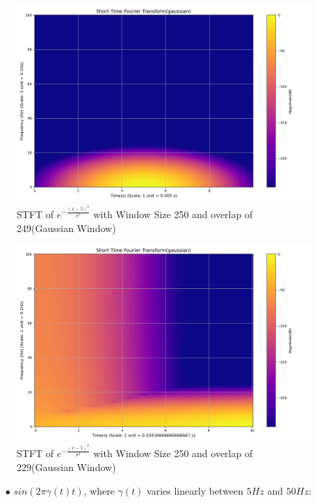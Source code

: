 \documentclass[12pt,a4paper,onecolumn]{exam}
\begin{document}
\begin{solution}
\begin{itemize}
\begin{itemize}
        \begin{figure}[H]
        \centering
        \includegraphics[scale = 0.35 ]{Gau_Win_gaussian_1_250.0.png}
        \caption{STFT of $e^{-\frac{(x-5)^2}{\sigma^2}}$ with Window Size 250 and overlap of 249(Gaussian Window)}
        \label{fig:17}
        \end{figure}

        \begin{figure}[H]
        \centering
        \includegraphics[scale = 0.35]{Gau_Win_gaussian_21_250.0.png}
        \caption{STFT of $e^{-\frac{(x-5)^2}{\sigma^2}}$ with Window Size 250 and overlap of 229(Gaussian Window)}
        \label{fig:18}
        \end{figure}

      \begin{itemize}
         \item[$\bullet$] $sin(2\pi\gamma(t)t)$, where $\gamma(t)$ varies linearly between $5Hz$ and $50Hz$:
      \end{itemize}
        

\end{itemize}
\end{itemize}
\end{solution}
\end{document}
